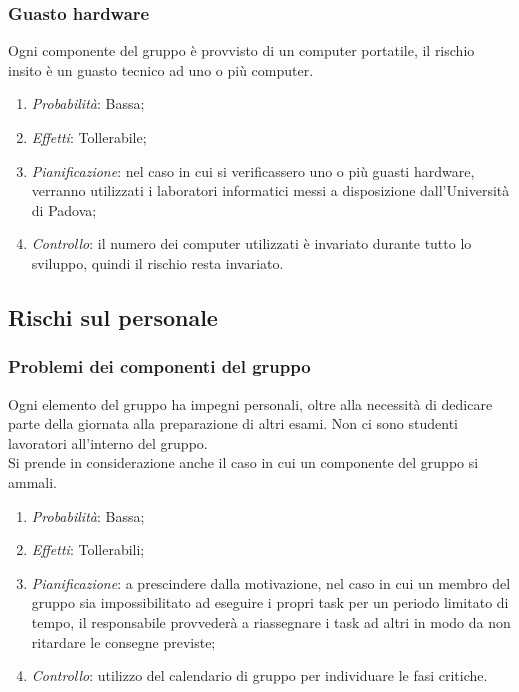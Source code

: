 		\subsubsection{Guasto hardware}
		
Ogni componente del gruppo è provvisto di un computer portatile, il rischio insito è un guasto tecnico ad uno o più computer.
\begin{enumerate}
\item \textit{Probabilità}: Bassa;
\item \textit{Effetti}: Tollerabile;
\item \textit{Pianificazione}: nel caso in cui si verificassero uno o più guasti hardware, verranno utilizzati i laboratori informatici messi a disposizione dall'Università di Padova;
\item \textit{Controllo}: il numero dei computer utilizzati è invariato durante tutto lo sviluppo, quindi il rischio resta invariato.
\end{enumerate}	
	
	
	\subsection{Rischi sul personale}
		\subsubsection{Problemi dei componenti del gruppo}
		
Ogni elemento del gruppo ha impegni personali, oltre alla necessità di dedicare parte della giornata alla preparazione di altri esami. Non ci sono studenti lavoratori all'interno del gruppo. \\
Si prende in considerazione anche il caso in cui un componente del gruppo si ammali. 		
\begin{enumerate}
\item \textit{Probabilità}: Bassa;
\item \textit{Effetti}: Tollerabili;
\item \textit{Pianificazione}: a prescindere dalla motivazione, nel caso in cui un membro del gruppo sia impossibilitato ad eseguire i propri task per un periodo limitato di tempo, il responsabile provvederà a riassegnare i task ad altri in modo da non ritardare le consegne previste;
\item \textit{Controllo}: utilizzo del calendario di gruppo per individuare le fasi critiche.
\end{enumerate}

